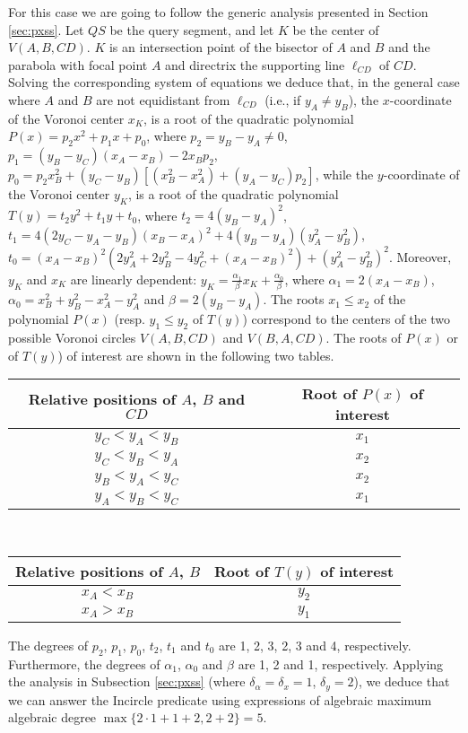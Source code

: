 \documentclass[letterpaper,11pt]{article}
\newcommand{\incircle}{\textsf{Incircle}\xspace}
\newcommand{\vor}{Voronoi\xspace}
\begin{document}
For this case we are going to follow the generic analysis presented in
Section \ref{sec:pxss}. Let $QS$ be the query segment, and
let $K$ be the center of $V(A,B,CD)$. $K$ is an intersection point 
of the bisector of $A$ and $B$ and the parabola with focal point $A$
and directrix the supporting line $\ell_{CD}$ of $CD$. Solving the
corresponding system of equations we deduce that, in the
general case where $A$ and $B$ are not equidistant from $\ell_{CD}$
(i.e., if $y_A\neq{}y_B$), the $x$-coordinate of the \vor center
$x_K$, is a root of the quadratic polynomial $P(x)=p_2x^2+p_1x+p_0$,
where
$p_{2}= y_{B}-y_{A}\neq{}0$,
$p_{1}= (y_{B}-y_{C}) (x_{A}-x_{B}) - 2x_{B}p_2$,
$p_{0}= p_2x_{B}^{2}+ (y_{C}-y_{B})[(x_{B}^{2}-x_{A}^{2})+(y_{A}-y_{C})p_2]$,
while the $y$-coordinate of the \vor center $y_K$, is a root of 
the quadratic polynomial $T(y)=t_2y^2+t_1y+t_0$, where
$t_2=4 (y_B-y_A)^2$,
$t_1=4(2y_C-y_A-y_B)(x_B-x_A)^2+4(y_B-y_A)(y_A^2-y_B^2)$,
$t_0=(x_A-x_B)^2(2y_A^2+2y_B^2 -4y_C^2 +(x_A-x_B)^2)+(y_A^2-y_B^2)^2$.
Moreover, $y_K$ and $ x_K $ are linearly dependent:
$y_K=\frac{\alpha_1}{\beta}x_K+\frac{\alpha_0}{\beta}$, where
$\alpha_1=2(x_A-x_B)$, $\alpha_0=x_B^2+y_B^2-x_A^2-y_A^2$ and 
$\beta=2(y_B-y_A)$.
The roots $x_1\leq{}x_2$ of the polynomial $P(x)$
(resp. $y_1\leq{}y_2$ of $T(y)$) correspond to the centers of the two
possible \vor circles $V(A,B,CD)$ and $V(B,A,CD)$.
The roots of $P(x)$ or of $T(y)$) of interest are shown in the
following two tables.
\begin{center}
\begin{tabular}{|c|c|}
\hline
Relative positions of $A$, $B$ and $CD$ & Root of $P(x)$ of interest\\
\hline \hline
 $ y_{C} < y_{A} < y_{B} $ & $x_{1}$\\ \hline
 $ y_{C} < y_{B} < y_{A} $ & $x_{2}$\\ \hline
 $ y_{B}< y_{A}<y_{C} $ & $x_{2}$\\ \hline
 $ y_{A} < y_{B} <y_{C} $& $x_{1}$\\ \hline
\end{tabular}\\[5pt]
\begin{tabular}{|c|c|}
\hline
Relative positions of $A$, $B$ & Root of $T(y)$ of interest\\
\hline \hline
$x_{A}<x_{B}$ & $y_{2}$ \\ \hline 
$x_{A}>x_{B}$ & $y_{1}$ \\ \hline 
\end{tabular}
\end{center}
The degrees of $p_2$, $p_1$, $p_0$, $t_2$, $t_1$ and $t_0$
are 1, 2, 3, 2, 3 and 4, respectively. Furthermore, the
degrees of $\alpha_1$, $\alpha_0$ and $\beta$ are 1, 2 and 1,
respectively. Applying the analysis in Subsection \ref{sec:pxss}
(where $\delta_\alpha=\delta_x=1$, $\delta_y=2$), we deduce that we
can answer the \incircle predicate using expressions of algebraic
maximum algebraic degree $\max\{2\cdot{}1+1+2,2+2\}=5$.
\end{document}
